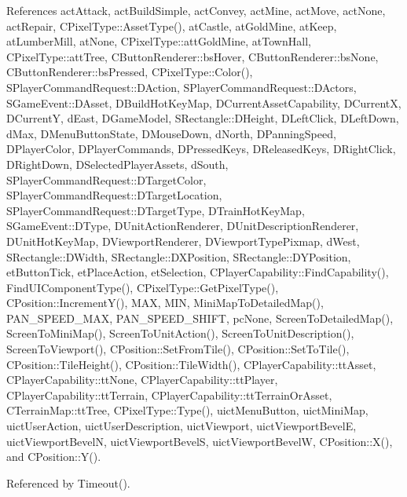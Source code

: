 References act\+Attack, act\+Build\+Simple, act\+Convey, act\+Mine, act\+Move, act\+None, act\+Repair, C\+Pixel\+Type\+::\+Asset\+Type(), at\+Castle, at\+Gold\+Mine, at\+Keep, at\+Lumber\+Mill, at\+None, C\+Pixel\+Type\+::att\+Gold\+Mine, at\+Town\+Hall, C\+Pixel\+Type\+::att\+Tree, C\+Button\+Renderer\+::bs\+Hover, C\+Button\+Renderer\+::bs\+None, C\+Button\+Renderer\+::bs\+Pressed, C\+Pixel\+Type\+::\+Color(), S\+Player\+Command\+Request\+::\+D\+Action, S\+Player\+Command\+Request\+::\+D\+Actors, S\+Game\+Event\+::\+D\+Asset, D\+Build\+Hot\+Key\+Map, D\+Current\+Asset\+Capability, D\+CurrentX, D\+CurrentY, d\+East, D\+Game\+Model, S\+Rectangle\+::\+D\+Height, D\+Left\+Click, D\+Left\+Down, d\+Max, D\+Menu\+Button\+State, D\+Mouse\+Down, d\+North, D\+Panning\+Speed, D\+Player\+Color, D\+Player\+Commands, D\+Pressed\+Keys, D\+Released\+Keys, D\+Right\+Click, D\+Right\+Down, D\+Selected\+Player\+Assets, d\+South, S\+Player\+Command\+Request\+::\+D\+Target\+Color, S\+Player\+Command\+Request\+::\+D\+Target\+Location, S\+Player\+Command\+Request\+::\+D\+Target\+Type, D\+Train\+Hot\+Key\+Map, S\+Game\+Event\+::\+D\+Type, D\+Unit\+Action\+Renderer, D\+Unit\+Description\+Renderer, D\+Unit\+Hot\+Key\+Map, D\+Viewport\+Renderer, D\+Viewport\+Type\+Pixmap, d\+West, S\+Rectangle\+::\+D\+Width, S\+Rectangle\+::\+D\+X\+Position, S\+Rectangle\+::\+D\+Y\+Position, et\+Button\+Tick, et\+Place\+Action, et\+Selection, C\+Player\+Capability\+::\+Find\+Capability(), Find\+U\+I\+Component\+Type(), C\+Pixel\+Type\+::\+Get\+Pixel\+Type(), C\+Position\+::\+Increment\+Y(), M\+AX, M\+IN, Mini\+Map\+To\+Detailed\+Map(), P\+A\+N\+\_\+\+S\+P\+E\+E\+D\+\_\+\+M\+AX, P\+A\+N\+\_\+\+S\+P\+E\+E\+D\+\_\+\+S\+H\+I\+FT, pc\+None, Screen\+To\+Detailed\+Map(), Screen\+To\+Mini\+Map(), Screen\+To\+Unit\+Action(), Screen\+To\+Unit\+Description(), Screen\+To\+Viewport(), C\+Position\+::\+Set\+From\+Tile(), C\+Position\+::\+Set\+To\+Tile(), C\+Position\+::\+Tile\+Height(), C\+Position\+::\+Tile\+Width(), C\+Player\+Capability\+::tt\+Asset, C\+Player\+Capability\+::tt\+None, C\+Player\+Capability\+::tt\+Player, C\+Player\+Capability\+::tt\+Terrain, C\+Player\+Capability\+::tt\+Terrain\+Or\+Asset, C\+Terrain\+Map\+::tt\+Tree, C\+Pixel\+Type\+::\+Type(), uict\+Menu\+Button, uict\+Mini\+Map, uict\+User\+Action, uict\+User\+Description, uict\+Viewport, uict\+Viewport\+BevelE, uict\+Viewport\+BevelN, uict\+Viewport\+BevelS, uict\+Viewport\+BevelW, C\+Position\+::\+X(), and C\+Position\+::\+Y().



Referenced by Timeout().


